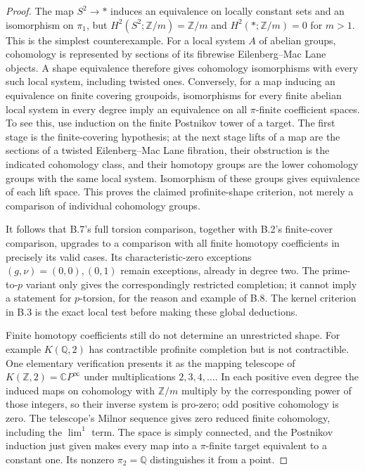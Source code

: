 \begin{proof}
The map $S^2\to *$ induces an equivalence on locally constant sets and an isomorphism on $\pi_1$, but
$H^2(S^2;\mathbb Z/m)=\mathbb Z/m$ and $H^2(*;\mathbb Z/m)=0$ for $m>1$.
This is the simplest counterexample. For a local system $A$ of abelian groups, cohomology is represented by sections of its fibrewise Eilenberg--Mac Lane objects. A shape equivalence therefore gives cohomology isomorphisms with every such local system, including twisted ones. Conversely, for a map inducing an equivalence on finite covering groupoids, isomorphisms for every finite abelian local system in every degree imply an equivalence on all $\pi$-finite coefficient spaces. To see this, use induction on the finite Postnikov tower of a target. The first stage is the finite-covering hypothesis; at the next stage lifts of a map are the sections of a twisted Eilenberg--Mac Lane fibration, their obstruction is the indicated cohomology class, and their homotopy groups are the lower cohomology groups with the same local system. Isomorphism of these groups gives equivalence of each lift space. This proves the claimed profinite-shape criterion, not merely a comparison of individual cohomology groups.

It follows that B.7's full torsion comparison, together with B.2's finite-cover comparison, upgrades to a comparison with all finite homotopy coefficients in precisely its valid cases. Its characteristic-zero exceptions $(g,\nu)=(0,0),(0,1)$ remain exceptions, already in degree two. The prime-to-$p$ variant only gives the correspondingly restricted completion; it cannot imply a statement for $p$-torsion, for the reason and example of B.8. The kernel criterion in B.3 is the exact local test before making these global deductions.

Finite homotopy coefficients still do not determine an unrestricted shape. For example $K(\mathbb Q,2)$ has contractible profinite completion but is not contractible. One elementary verification presents it as the mapping telescope of $K(\mathbb Z,2)=\mathbb CP^\infty$ under multiplications $2,3,4,\ldots$. In each positive even degree the induced maps on cohomology with $\mathbb Z/m$ multiply by the corresponding power of those integers, so their inverse system is pro-zero; odd positive cohomology is zero. The telescope's Milnor sequence gives zero reduced finite cohomology, including the $\lim^1$ term. The space is simply connected, and the Postnikov induction just given makes every map into a $\pi$-finite target equivalent to a constant one. Its nonzero $\pi_2=\mathbb Q$ distinguishes it from a point.


\end{proof}
